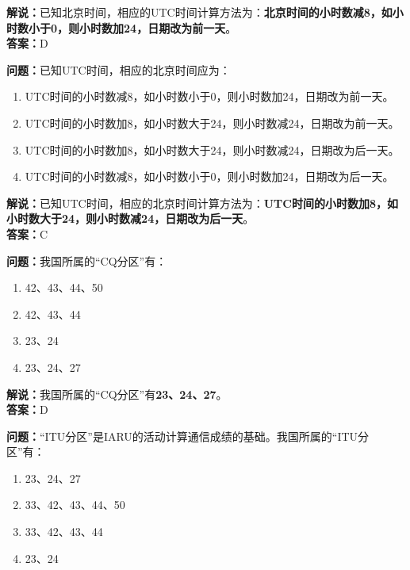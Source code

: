 \textbf{解说：}已知北京时间，相应的UTC时间计算方法为：\textbf{北京时间的小时数减8，如小时数小于0，则小时数加24，日期改为前一天}。\\\textbf{答案：}D



\textbf{问题：}已知UTC时间，相应的北京时间应为：

\begin{enumerate}[label=\Alph*), leftmargin=1.5cm]
	\item UTC时间的小时数减8，如小时数小于0，则小时数加24，日期改为前一天。
	\item UTC时间的小时数加8，如小时数大于24，则小时数减24，日期改为前一天。
	\item UTC时间的小时数加8，如小时数大于24，则小时数减24，日期改为后一天。
	\item UTC时间的小时数减8，如小时数小于0，则小时数加24，日期改为后一天。
\end{enumerate}

\textbf{解说：}已知UTC时间，相应的北京时间计算方法为：\textbf{UTC时间的小时数加8，如小时数大于24，则小时数减24，日期改为后一天}。\\\textbf{答案：}C



\textbf{问题：}我国所属的“CQ分区”有：

\begin{enumerate}[label=\Alph*), leftmargin=1.5cm]
	\item 42、43、44、50
	\item 42、43、44
	\item 23、24
	\item 23、24、27
\end{enumerate}

\textbf{解说：}我国所属的“CQ分区”有\textbf{23、24、27}。\\\textbf{答案：}D



\textbf{问题：}“ITU分区”是IARU的活动计算通信成绩的基础。我国所属的“ITU分区”有：

\begin{enumerate}[label=\Alph*), leftmargin=1.5cm]
	\item 23、24、27
	\item 33、42、43、44、50
	\item 33、42、43、44
	\item 23、24
\end{enumerate}

